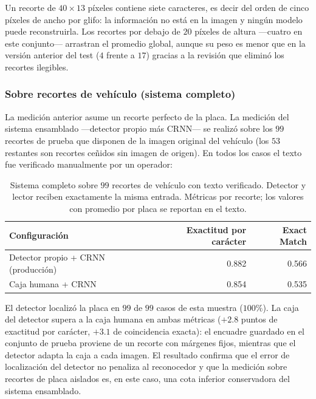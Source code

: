 Un recorte de $40 \times 13$ píxeles contiene siete caracteres, es decir del orden
de cinco píxeles de ancho por glifo: la información no está en la imagen y ningún
modelo puede reconstruirla. Los recortes por debajo de $20$ píxeles de altura
---cuatro en este conjunto--- arrastran el promedio global, aunque su peso
es menor que en la versión anterior del test ($4$ frente a $17$) gracias a la
revisión que eliminó los recortes ilegibles.

\subsubsection{Sobre recortes de vehículo (sistema completo)}

La medición anterior asume un recorte perfecto de la placa. La medición del
sistema ensamblado ---detector propio más CRNN--- se realizó sobre los $99$
recortes de prueba que disponen de la imagen original del vehículo (los $53$
restantes son recortes ceñidos sin imagen de origen). En todos los casos el texto
fue verificado manualmente por un operador:

\begin{table}[H]
    \centering
    \caption{Sistema completo sobre $99$ recortes de vehículo con texto verificado.
    Detector y lector reciben exactamente la misma entrada. Métricas por recorte;
    los valores con promedio por placa se reportan en el texto.}
    \begin{tabular}{lrr}
        \toprule
        \textbf{Configuración} & \textbf{Exactitud por carácter} & \textbf{Exact Match} \\
        \midrule
        Detector propio + CRNN (producción) & 0.882 & 0.566 \\
        Caja humana + CRNN                  & 0.854 & 0.535 \\
        \bottomrule
    \end{tabular}
\end{table}

El detector localizó la placa en $99$ de $99$ casos de esta muestra
($100\%$). La caja del detector supera a la caja humana en ambas métricas
($+2{.}8$ puntos de exactitud por carácter, $+3{.}1$ de coincidencia exacta): el
encuadre guardado en el conjunto de prueba proviene de un recorte con márgenes
fijos, mientras que el detector adapta la caja a cada imagen. El resultado
confirma que el error de localización del detector no penaliza al reconocedor y que
la medición sobre recortes de placa aislados es, en este caso, una cota inferior
conservadora del sistema ensamblado.

